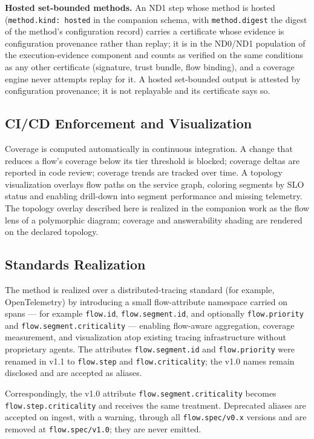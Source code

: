 \documentclass[11pt]{article}
\newcommand{\code}[1]{\texttt{#1}}
\begin{document}
\textbf{Hosted set-bounded methods.} An ND1 step whose method is hosted (\code{method.kind: hosted} in the companion schema, with \code{method.digest} the digest of the method's configuration record) carries a certificate whose evidence is configuration provenance rather than replay; it is in the ND0/ND1 population of the execution-evidence component and counts as verified on the same conditions as any other certificate (signature, trust bundle, flow binding), and a coverage engine never attempts replay for it. A hosted set-bounded output is attested by configuration provenance; it is not replayable and its certificate says so.

\subsection{CI/CD Enforcement and Visualization}
Coverage is computed automatically in continuous integration. A change that reduces a flow's coverage below its tier threshold is blocked; coverage deltas are reported in code review; coverage trends are tracked over time. A topology visualization overlays flow paths on the service graph, coloring segments by SLO status and enabling drill-down into segment performance and missing telemetry. The topology overlay described here is realized in the companion work as the flow lens of a polymorphic diagram; coverage and answerability shading are rendered on the declared topology.

\subsection{Standards Realization}
The method is realized over a distributed-tracing standard (for example, OpenTelemetry) by introducing a small flow-attribute namespace carried on spans --- for example \code{flow.id}, \code{flow.segment.id}, and optionally \code{flow.priority} and \code{flow.segment.criticality} --- enabling flow-aware aggregation, coverage measurement, and visualization atop existing tracing infrastructure without proprietary agents. The attributes \code{flow.segment.id} and \code{flow.priority} were renamed in v1.1 to \code{flow.step} and \code{flow.criticality}; the v1.0 names remain disclosed and are accepted as aliases.

\begin{sloppypar}
Correspondingly, the v1.0 attribute \code{flow.segment.criticality} becomes \code{flow.step.criticality} and receives the same treatment. Deprecated aliases are accepted on ingest, with a warning, through all \code{flow.spec/v0.x} versions and are removed at \code{flow.spec/v1.0}; they are never emitted.
\end{sloppypar}
\end{document}
